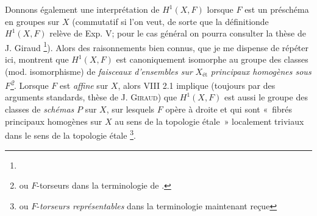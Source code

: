 \documentclass[10pt]{../fichiers-configuration-latex/smfart}
\begin{document}
\begin{enumerate}
Donnons également une interprétation de $H^1(X, F)$ lorsque $F$ est
un préschéma en groupes sur $X$ (commutatif si l'on veut, de sorte
que la définition\pageoriginale de $H^{1}(X, F)$ relève de Exp. V;
pour le cas général on pourra consulter la thèse de J. Giraud
\footnote{}). Alors des raisonnements bien connus, que
je me dispense de répéter ici, montrent que $H^1 (X, F)$ est
canoniquement isomorphe au groupe des classes (mod. isomorphisme) de
\emph{faisceaux d'ensembles sur} $X_{\text{ét}}$
  \emph{principaux homogènes sous $F$\footnote{ou $F$-torseurs dans la
    terminologie de \loccit.}}. Lorsque $F$ est \emph{affine} sur
$X$, alors  VIII 2.1 implique (toujours par des arguments
standards, \cf thèse de J. \textsc{Giraud}) que $H^{1} (X, F)$ est aussi le
groupe des classes de \emph{schémas} $P$ sur $X$, sur lesquels $F$
opère à droite et qui sont « fibrés principaux homogènes sur $X$ au
sens de la topologie étale » \ie localement triviaux dans le sens de
la topologie étale \footnote{ou $F$-\emph{torseurs représentables}
  dans la terminologie maintenant reçue}.
 \end{enumerate}
\end{document}
